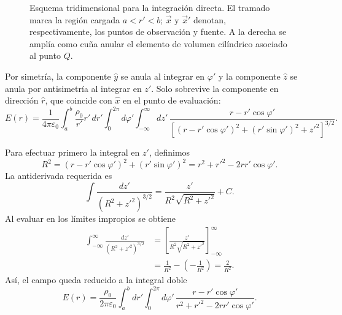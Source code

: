 \documentclass[11pt]{article}
\begin{document}
\begin{figure}[htbp]
\caption{Esquema tridimensional para la integración directa. El tramado marca
la región cargada $a<r'<b$; $\vec{x}$ y $\vec{x}'$ denotan, respectivamente,
los puntos de observación y fuente. A la derecha se amplía como cuña anular el
elemento de volumen cilíndrico asociado al punto $Q$.}
\label{fig:integracion-directa}
\end{figure}

Por simetría, la componente $\hat{y}$ se anula al integrar en $\varphi'$ y la
componente $\hat{z}$ se anula por antisimetría al integrar en $z'$. Solo
sobrevive la componente en dirección $\hat{r}$, que coincide con $\hat{x}$ en
el punto de evaluación:
\begin{equation}
E(r)=\frac{1}{4\pi\varepsilon_0}
\int_a^b\frac{\rho_0}{r'}r'\,dr'
\int_0^{2\pi}d\varphi'
\int_{-\infty}^{\infty}dz'\,
\frac{r-r'\cos\varphi'}
{\left[(r-r'\cos\varphi')^2+(r'\sin\varphi')^2+z'^2\right]^{3/2}}.
\end{equation}

Para efectuar primero la integral en $z'$, definimos
\[
R^2=(r-r'\cos\varphi')^2+(r'\sin\varphi')^2
=r^2+r'^2-2rr'\cos\varphi'.
\]
La antiderivada requerida es
\[
\int\frac{dz'}{(R^2+z'^2)^{3/2}}
=\frac{z'}{R^2\sqrt{R^2+z'^2}}+C.
\]
Al evaluar en los límites impropios se obtiene
\begin{equation}
\begin{aligned}
\int_{-\infty}^{\infty}\frac{dz'}{(R^2+z'^2)^{3/2}}
&=\left[
\frac{z'}{R^2\sqrt{R^2+z'^2}}
\right]_{-\infty}^{\infty}\\
&=\frac{1}{R^2}-\left(-\frac{1}{R^2}\right)
=\frac{2}{R^2}.
\end{aligned}
\end{equation}
Así, el campo queda reducido a la integral doble
\begin{equation}
E(r)=\frac{\rho_0}{2\pi\varepsilon_0}
\int_a^b dr'\int_0^{2\pi}d\varphi'\,
\frac{r-r'\cos\varphi'}
{r^2+r'^2-2rr'\cos\varphi'}.
\label{eq:integral-doble}
\end{equation}
\end{document}
